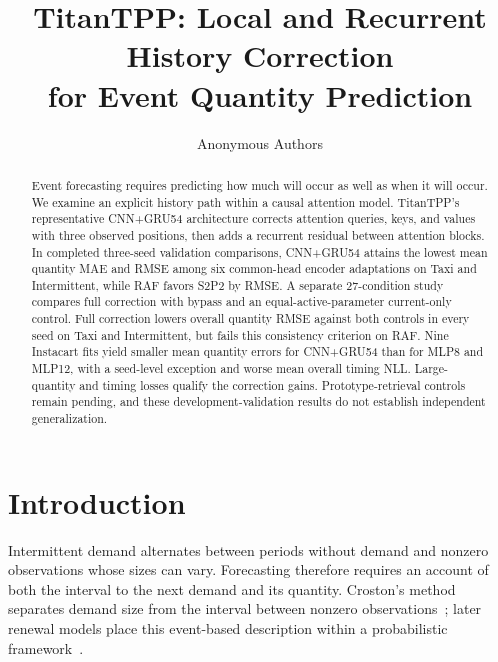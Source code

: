 \documentclass[runningheads]{llncs}
\begin{document}
\title{TitanTPP: Local and Recurrent History Correction\texorpdfstring{\\}{ }for Event Quantity Prediction}
\author{Anonymous Authors}
\maketitle

\begin{abstract}
Event forecasting requires predicting how much will occur as well as when it will occur.
We examine an explicit history path within a causal attention model.
TitanTPP's representative CNN+GRU54 architecture corrects attention queries, keys, and values with three observed positions, then adds a recurrent residual between attention blocks.
In completed three-seed validation comparisons, CNN+GRU54 attains the lowest mean quantity MAE and RMSE among six common-head encoder adaptations on Taxi and Intermittent, while RAF favors S2P2 by RMSE.
A separate 27-condition study compares full correction with bypass and an equal-active-parameter current-only control.
Full correction lowers overall quantity RMSE against both controls in every seed on Taxi and Intermittent, but fails this consistency criterion on RAF.
Nine Instacart fits yield smaller mean quantity errors for CNN+GRU54 than for MLP8 and MLP12, with a seed-level exception and worse mean overall timing NLL.
Large-quantity and timing losses qualify the correction gains. Prototype-retrieval controls remain pending, and these development-validation results do not establish independent generalization.
\end{abstract}

\section{Introduction}
Intermittent demand alternates between periods without demand and nonzero observations whose sizes can vary. Forecasting therefore requires an account of both the interval to the next demand and its quantity. Croston's method separates demand size from the interval between nonzero observations~\cite{croston1972forecasting}; later renewal models place this event-based description within a probabilistic framework~\cite{turkmen2021renewal}.
\end{document}
